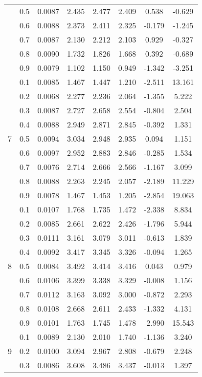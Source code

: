\documentclass[11pt,a4paper]{report}
\begin{document}
\begin{longtable}{ | c | c || c | c | c | c | c | c | }
 & 0.5 & 0.0087 & 2.435 & 2.477 & 2.409 & 0.538 & -0.629 \\
 & 0.6 & 0.0088 & 2.373 & 2.411 & 2.325 & -0.179 & -1.245 \\
 & 0.7 & 0.0087 & 2.130 & 2.212 & 2.103 & 0.929 & -0.327 \\
 & 0.8 & 0.0090 & 1.732 & 1.826 & 1.668 & 0.392 & -0.689 \\
 & 0.9 & 0.0079 & 1.102 & 1.150 & 0.949 & -1.342 & -3.251 \\
 \hline
\multirow{9}{*}{7} & 0.1 & 0.0085 & 1.467 & 1.447 & 1.210 & -2.511 & 13.161 \\
 & 0.2 & 0.0068 & 2.277 & 2.236 & 2.064 & -1.355 & 5.222 \\
 & 0.3 & 0.0087 & 2.727 & 2.658 & 2.554 & -0.804 & 2.504 \\
 & 0.4 & 0.0088 & 2.949 & 2.871 & 2.845 & -0.392 & 1.331 \\
 & 0.5 & 0.0094 & 3.034 & 2.948 & 2.935 & 0.094 & 1.151 \\
 & 0.6 & 0.0097 & 2.952 & 2.883 & 2.846 & -0.285 & 1.534 \\
 & 0.7 & 0.0076 & 2.714 & 2.666 & 2.566 & -1.167 & 3.099 \\
 & 0.8 & 0.0088 & 2.263 & 2.245 & 2.057 & -2.189 & 11.229 \\
 & 0.9 & 0.0078 & 1.467 & 1.453 & 1.205 & -2.854 & 19.063 \\
 \hline
\multirow{9}{*}{8} & 0.1 & 0.0107 & 1.768 & 1.735 & 1.472 & -2.338 & 8.834 \\
 & 0.2 & 0.0085 & 2.661 & 2.622 & 2.426 & -1.796 & 5.944 \\
 & 0.3 & 0.0111 & 3.161 & 3.079 & 3.011 & -0.613 & 1.839 \\
 & 0.4 & 0.0092 & 3.417 & 3.345 & 3.326 & -0.094 & 1.265 \\
 & 0.5 & 0.0084 & 3.492 & 3.414 & 3.416 & 0.043 & 0.979 \\
 & 0.6 & 0.0106 & 3.399 & 3.338 & 3.329 & -0.008 & 1.156 \\
 & 0.7 & 0.0112 & 3.163 & 3.092 & 3.000 & -0.872 & 2.293 \\
 & 0.8 & 0.0108 & 2.668 & 2.611 & 2.433 & -1.332 & 4.131 \\
 & 0.9 & 0.0101 & 1.763 & 1.745 & 1.478 & -2.990 & 15.543 \\
 \hline
\multirow{9}{*}{9} & 0.1 & 0.0089 & 2.130 & 2.010 & 1.740 & -1.136 & 3.240 \\
 & 0.2 & 0.0100 & 3.094 & 2.967 & 2.808 & -0.679 & 2.248 \\
 & 0.3 & 0.0086 & 3.608 & 3.486 & 3.437 & -0.013 & 1.397 \\

\end{longtable}
\end{document}

